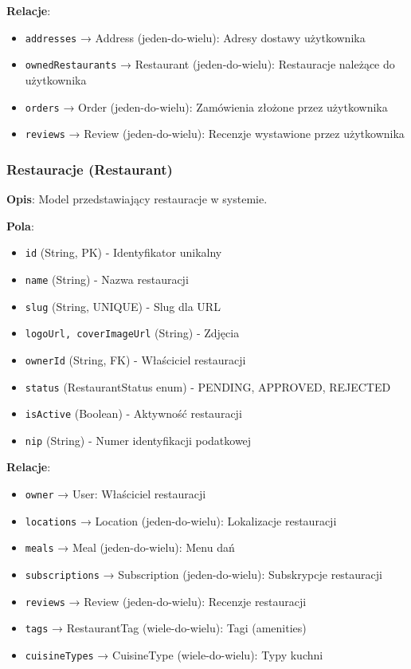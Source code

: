 \documentclass[12pt,a4paper,utf-8]{article}
\begin{document}
\textbf{Relacje}:
\begin{itemize}
    \item \texttt{addresses} → Address (jeden-do-wielu): Adresy dostawy użytkownika
    \item \texttt{ownedRestaurants} → Restaurant (jeden-do-wielu): Restauracje należące do użytkownika
    \item \texttt{orders} → Order (jeden-do-wielu): Zamówienia złożone przez użytkownika
    \item \texttt{reviews} → Review (jeden-do-wielu): Recenzje wystawione przez użytkownika
\end{itemize}

\subsubsection{Restauracje (Restaurant)}

\textbf{Opis}: Model przedstawiający restauracje w systemie.

\textbf{Pola}:
\begin{itemize}
    \item \texttt{id} (String, PK) - Identyfikator unikalny
    \item \texttt{name} (String) - Nazwa restauracji
    \item \texttt{slug} (String, UNIQUE) - Slug dla URL
    \item \texttt{logoUrl, coverImageUrl} (String) - Zdjęcia
    \item \texttt{ownerId} (String, FK) - Właściciel restauracji
    \item \texttt{status} (RestaurantStatus enum) - PENDING, APPROVED, REJECTED
    \item \texttt{isActive} (Boolean) - Aktywność restauracji
    \item \texttt{nip} (String) - Numer identyfikacji podatkowej
\end{itemize}

\textbf{Relacje}:
\begin{itemize}
    \item \texttt{owner} → User: Właściciel restauracji
    \item \texttt{locations} → Location (jeden-do-wielu): Lokalizacje restauracji
    \item \texttt{meals} → Meal (jeden-do-wielu): Menu dań
    \item \texttt{subscriptions} → Subscription (jeden-do-wielu): Subskrypcje restauracji
    \item \texttt{reviews} → Review (jeden-do-wielu): Recenzje restauracji
    \item \texttt{tags} → RestaurantTag (wiele-do-wielu): Tagi (amenities)
    \item \texttt{cuisineTypes} → CuisineType (wiele-do-wielu): Typy kuchni
\end{itemize}
\end{document}
